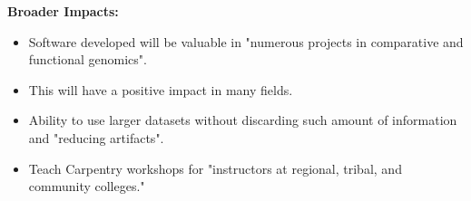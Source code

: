 \textbf{Broader Impacts:}\\
\begin{itemize}
    \item Software developed will be valuable in "numerous projects in comparative
        and functional genomics".
    \item This will have a positive impact in many fields.
    \item Ability to use larger datasets without discarding such amount of
        information and "reducing artifacts".
    \item Teach Carpentry workshops for "instructors at regional, tribal, and
        community colleges."
\end{itemize}
